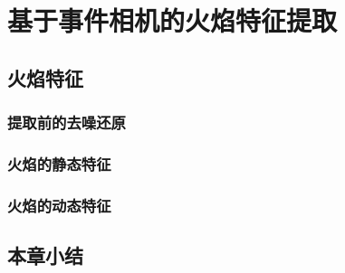 
\chapter{基于事件相机的火焰特征提取}

\section{火焰特征}

\subsection{提取前的去噪还原}

\subsection{火焰的静态特征}

\subsection{火焰的动态特征}

\section{本章小结}

